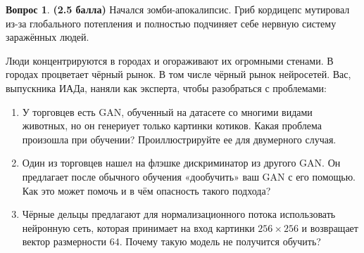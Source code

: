 \documentclass[12pt]{article}
\theoremstyle{definition}
\newtheorem{question}{Вопрос}
\begin{document}
\begin{question} \textbf{(2.5 балла)} \newline
    Начался зомби-апокалипсис. Гриб кордицепс мутировал из-за глобального потепления и полностью подчиняет себе нервную систему заражённых людей.

    Люди концентрируются в городах и огораживают их огромными стенами. В городах процветает чёрный рынок. В том числе чёрный рынок нейросетей. Вас, выпускника ИАДа, наняли как эксперта, чтобы разобраться с проблемами:

    \begin{enumerate}
        \item У торговцев есть GAN, обученный на датасете со многими видами животных, но он генериует только картинки котиков. Какая проблема произошла при обучении? Проиллюстрируйте ее для двумерного случая.

        \item Один из торговцев нашел на флэшке дискриминатор из другого GAN. Он предлагает после обычного обучения «дообучить» ваш GAN с его помощью. Как это может помочь и в чём опасность такого подхода? 
        
        \item Чёрные дельцы предлагают для нормализационного потока использовать нейронную сеть, которая принимает на вход картинки $256 \times 256$ и возвращает вектор размерности $64$. Почему такую модель не получится обучить?
    \end{enumerate}
\end{question}

\newpage
\end{document}
